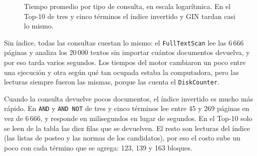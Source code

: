 \documentclass[a4paper,12pt]{article}
\begin{document}
\begin{figure}[H]
\centering
{}
\caption{Tiempo promedio por tipo de consulta, en escala logarítmica. En el
Top-10 de tres y cinco términos el índice invertido y GIN tardan casi lo mismo.}
\label{fig:e6-latencia}
\end{figure}

Sin índice, todas las consultas cuestan lo mismo: el \texttt{FullTextScan} lee
las 6\,666 páginas y analiza los 20\,000 textos sin importar cuántos documentos
devuelva, y por eso tarda varios segundos. Los tiempos del motor cambiaron un
poco entre una ejecución y otra según qué tan ocupada estaba la computadora,
pero las lecturas siempre fueron las mismas, porque las cuenta el
\texttt{DiskCounter}.

Cuando la consulta devuelve pocos documentos, el índice invertido es mucho más
rápido. En \texttt{AND} y \texttt{AND NOT} de tres y cinco términos lee entre 45
y 269 páginas en vez de 6\,666, y responde en milisegundos en lugar de segundos.
En el Top-10 solo se leen de la tabla las diez filas que se devuelven. El resto
son lecturas del índice (las listas de posteo y las normas de los candidatos),
por eso el costo sube un poco con cada término que se agrega: 123, 139 y 163
bloques.
\end{document}
